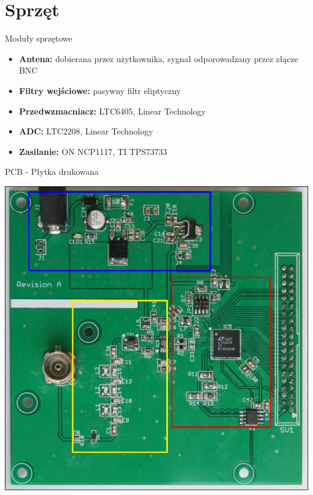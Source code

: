 \section{Sprzęt}
\begin{frame}{Moduły sprzętowe}

	\begin{itemize}
		\item \textbf{Antena:} dobierana przez użytkownika, sygnał odporowadzany przez złącze BNC
		\item \textbf{Filtry wejściowe:} pasywny filtr eliptyczny
		\item \textbf{Przedwzmacniacz:} LTC6405, Linear Technology
		\item \textbf{ADC:} LTC2208, Linear Technology
		\item \textbf{Zasilanie:} ON NCP1117, TI TPS73733
	\end{itemize} 
\end{frame}

\begin{frame}{PCB - Płytka drukowana}
	\begin{center}
		\scalebox{0.26}
		{\includegraphics{images/pcb-physical}}
	\end{center}
\end{frame}

